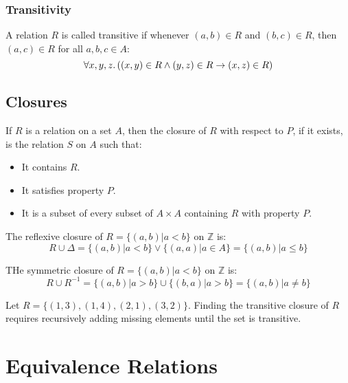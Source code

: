\subsubsection{Transitivity}
A relation \(R\) is called transitive if whenever \((a, b) \in R\) and \((b, c) \in R\), then \((a, c) \in R\) for all \(a, b, c \in A\):
\begin{equation*}
    \forall x, y, z \ldotp ((x, y) \in R \land (y, z) \in R \rightarrow (x, z) \in R)
\end{equation*}

\subsection{Closures}
If \(R\) is a relation on a set \(A\), then the closure of \(R\) with respect to \(P\), if it exists, is the relation \(S\) on \(A\) such that:
\begin{itemize}
    \item It contains \(R\).
    \item It satisfies property \(P\).
    \item It is a subset of every subset of \(A \times A\) containing \(R\) with property \(P\).
\end{itemize}
\begin{example}
    The reflexive closure of \(R = \{(a, b) | a < b\}\) on \(\mathbb{Z}\) is:
    \begin{equation*}
        R \cup \Delta = \{(a, b) | a < b\} \lor \{(a, a) | a \in A\} = \{(a, b) | a \leq b\}
    \end{equation*}
\end{example}

\begin{example}
    THe symmetric closure of \(R = \{(a, b) | a < b\}\) on \(\mathbb{Z}\) is:
    \begin{equation*}
        R \cup R^{-1} = \{(a, b) | a > b\} \cup \{(b, a) | a > b\} = \{(a, b) | a \neq b\}
    \end{equation*}
\end{example}

\begin{example}
    Let \(R = \{(1, 3),(1, 4),(2, 1),(3, 2)\}\). Finding the transitive closure of \(R\) requires recursively adding missing elements until the set is transitive.
\end{example}

\section{Equivalence Relations}
